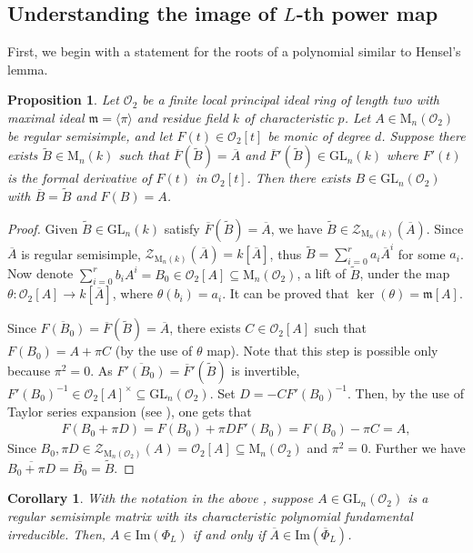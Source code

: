 \documentclass[11pt,twoside]{amsart}
\newcommand{\GL}{\mathrm{GL}}
\newcommand{\M}{\mathrm{M}}
\newcommand{\im}{\mathrm{Im}}
\newcommand{\R}{\mathscr{O}_2}
\newcommand{\Zen}{\mathscr{Z}}
\newtheorem{proposition}[lemma]{Proposition}
\newtheorem{corollary}[lemma]{Corollary}
\theoremstyle{definition} %
\begin{document}
\subsection{Understanding the image of $L$-th power map}

First, we begin with a statement for the roots of a polynomial similar to Hensel's lemma. 
\begin{proposition}\label{prop:hens-root-full}
Let $\R$ be a finite local principal ideal ring of length two with maximal ideal $\mathfrak m= \langle \pi \rangle$ and residue field $k$ of characteristic $p$. 
Let $A\in \M_n(\R)$ be regular semisimple, and let $F(t)\in \R[t]$ be monic of degree $d$. Suppose there exists $\widetilde{B} \in \M_n(k)$ such that $
\overline{F}(\widetilde{B}) = \overline{A}$ and 
$\overline{F}'(\widetilde{B})\in \GL_n(k)$ where $F'(t)$ is the formal derivative of $F(t)$ in $\R[t]$. 
Then there exists $B\in \GL_n(\R)$ with $\overline{B}=\widetilde{B}$ and $F(B)=A$.
\end{proposition}
\begin{proof}
Given $\widetilde{B} \in\GL_n(k)$ satisfy $\overline{F}(\widetilde{B})=\overline{A}$, we have $\widetilde{B}\in\Zen_{\M_n(k)}(\overline{A})$.
Since $\overline{A}$ is regular semisimple, $\Zen_{\M_n(k)}(\overline{A}) = k[\overline{A}]$, thus
$\widetilde{B} = \sum\limits_{i=0}^ra_i \overline{A}^i$ for some $a_i$. Now denote $\sum\limits_{i=0}^r b_i A^i = B_0 \in\R[A] \subseteq\M_n(\R)$, a lift of $\widetilde{B}$, under the map $\theta \colon \R[A] \longrightarrow k[\overline{A}]$, where $\theta(b_i)=a_i$. It can be proved that $\ker(\theta) = \mathfrak{m}[A]$.

Since $\overline{F(B_0)}=\overline{F}(\widetilde{B}) = \overline{A}$, there exists $C\in\R[A]$ such that $F(B_0)=A+ \pi C$ (by the use of $\theta$ map).
Note that this step is possible only because $\pi^2=0$.
As $\overline{F'(B_0)} = \overline{F}'(\widetilde{B})$ is invertible, ${F'(B_0)}^{-1} \in \R[A]^\times \subseteq\GL_n(\R)$. Set $D = -CF'(B_0)^{-1}$. Then, by the use of Taylor series expansion (see \cite{ConradHensel}), one gets that
\begin{align*}
    F(B_0+\pi D)= F(B_0)+ \pi DF'(B_0) = F(B_0)-\pi C=A,
\end{align*}
Since $B_0,\pi D\in\Zen_{\M_n(\R)}(A) = \R[A]\subseteq \M_n(\R)$ and $\pi^2=0$.
Further we have $\overline{B_0+\pi D}=\overline{B_0}=\widetilde{B}$.
\end{proof}
\begin{corollary}\label{prop-A-regsem-irred}
With the notation in the above , suppose $A\in \GL_n(\R)$ is a regular semisimple matrix with its characteristic polynomial fundamental irreducible. Then, $A\in \im(\Phi_L)$ if and only if $\overline{A}\in \im(\overline{\Phi}_L)$.
\end{corollary}
\end{document}
